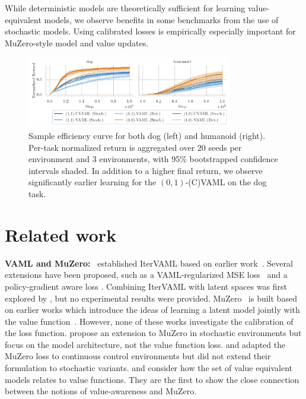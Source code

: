 \begin{boxinsight}
While deterministic models are theoretically sufficient for learning value-equivalent models, we observe benefits in some benchmarks from the use of stochastic models.
Using calibrated losses is empirically especially important for MuZero-style model and value updates.
\end{boxinsight}

\begin{figure}[t]
    \centering
    \includegraphics[width=0.8\textwidth]{figures/lambda/plts/reward.pdf} 
    \caption{Sample efficiency curve for both dog (left) and humanoid (right). Per-task normalized return is aggregated over 20 seeds per environment and 3 environments, with 95\% bootstrapped confidence intervals shaded. 
    In addition to a higher final return, we observe significantly earlier learning for the $(0,1)$-(C)VAML on the dog task.}
   \label{fig:dmc_reward}
\end{figure}

\section{Related work}

\textbf{VAML and MuZero:}~ \textcite{itervaml} established IterVAML based on earlier work~\parencite{vaml}.
Several extensions have been proposed, such as a VAML-regularized MSE loss~\parencite{voelcker2022value} and a policy-gradient aware loss \parencite{abachi2020policy}.
Combining IterVAML with latent spaces was first explored by \textcite{abachi2022viper}, but no experimental results were provided.
MuZero~\parencite{schrittwieser2020mastering,ye2021mastering} is built based on earlier works which introduce the ideas of learning a latent model jointly with the value function~\parencite{silver2017predictron,oh2017value}.
However, none of these works investigate the calibration of the loss function.
\textcite{antonoglou2022planning} propose an extension to MuZero in stochastic environments but focus on the model architecture, not the value function loss.
\textcite{hansen2022temporal} and \textcite{hansen2024tdmpc} adapted the MuZero loss to continuous control environments but did not extend their formulation to stochastic variants.
\textcite{grimm2020value} and \textcite{grimm2021proper} consider how the set of value equivalent models relates to value functions. 
They are the first to show the close connection between the notions of value-awareness and MuZero.

